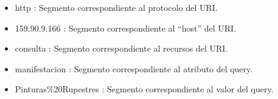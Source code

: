 \begin{itemize}
\item http : Segmento correspondiente al protocolo del URI. 
\item 159.90.9.166 : Segmento correspondiente al ``host'' del URI. 
\item consulta : Segmento correspondiente al recursos del URI.
\item manifestacion : Segmento correspondiente al atributo del query.
\item Pinturas\%20Rupestres : Segmento correspondiente al valor del query.  
\end{itemize}

















 




